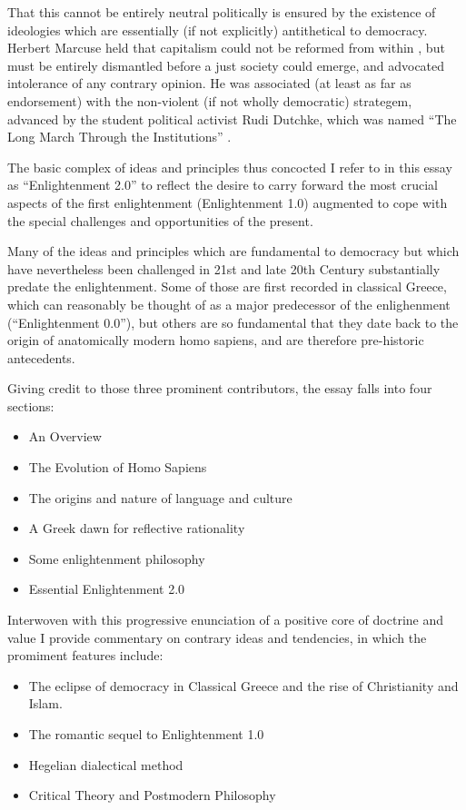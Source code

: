 \documentclass[10pt,titlepage]{article}
\begin{document}
That this cannot be entirely neutral politically is ensured by the existence of ideologies which are essentially (if not explicitly) antithetical to democracy.
Herbert Marcuse held that capitalism could not be reformed from within \cite{marcuse-repressive, marcuse-liberation}, but must be entirely dismantled before a just society could emerge, and advocated intolerance of any contrary opinion.
He was associated (at least as far as endorsement) with the non-violent (if not wholly democratic) strategem, advanced by the student political activist Rudi Dutchke, which was named ``The Long March Through the Institutions'' \cite{sidwell-long}.

The basic complex of ideas and principles thus concocted I refer to in this essay as ``Enlightenment 2.0'' to reflect the desire to carry forward the most crucial aspects of the first enlightenment (Enlightenment 1.0) augmented to cope with the special challenges and opportunities of the present.

Many of the ideas and principles which are fundamental to democracy but which have nevertheless been challenged in 21st and late 20th Century substantially predate the enlightenment.
Some of those are first recorded in classical Greece, which can reasonably be thought of as a major predecessor of the enlighenment (``Enlightenment 0.0''), but others are so fundamental that they date back to the origin of anatomically modern homo sapiens, and are therefore pre-historic antecedents.

Giving credit to those three prominent contributors, the essay falls into four sections:

\begin{itemize}
\item An Overview
\item The Evolution of Homo Sapiens
\item The origins and nature of language and culture
\item A Greek dawn for reflective rationality
\item Some enlightenment philosophy
\item Essential Enlightenment 2.0
\end{itemize}

Interwoven with this progressive enunciation of a positive core of doctrine and value I provide commentary on contrary ideas and tendencies, in which the promiment features include:

\begin{itemize}
\item The eclipse of democracy in Classical Greece and the rise of Christianity and Islam.
\item The romantic sequel to Enlightenment 1.0
\item Hegelian dialectical method
  \item Critical Theory and Postmodern Philosophy
\end{itemize}
\end{document}
